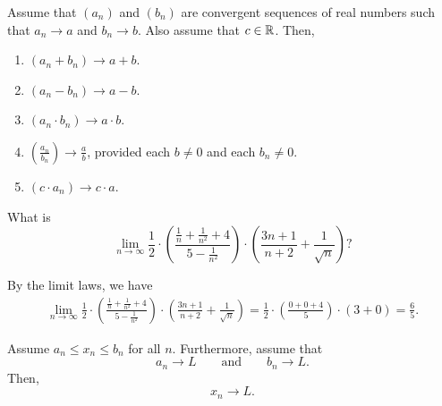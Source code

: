 \documentclass[11pt,twoside=off,numbers=noenddot]{scrbook}
\begin{document}
\begin{theorem}
  Assume that $(a_n)$ and $(b_n)$ are convergent sequences of real
  numbers such that $a_n \to a$ and $b_n \to b$. Also assume that $c
  \in \mathbb R$. Then,
  \begin{enumerate}
    \item $(a_n + b_n) \to a + b$.
    \item $(a_n - b_n) \to a - b$.
    \item $(a_n \cdot b_n) \to a \cdot b$.
    \item $(\frac{a_n}{b_n}) \to \frac{a}{b}$, provided each $b \neq
      0$ and each $b_n \neq 0$.
    \item $(c \cdot a_n) \to c \cdot a$.
  \end{enumerate}
\end{theorem}

\begin{example}
  What is
  \[ \lim_{n\to\infty} \frac{1}{2} \cdot \left(\frac{\frac{1}{n} +
    \frac{1}{n^2} + 4}{5 - \frac{1}{n^2}}\right) \cdot
  \left(\frac{3n+1}{n+2} + \frac{1}{\sqrt{n}}\right)? \]

  By the limit laws, we have
  \begin{align*}
    \lim_{n\to\infty} \frac{1}{2} \cdot \left(\frac{\frac{1}{n} +
    \frac{1}{n^2} + 4}{5 - \frac{1}{n^2}}\right) \cdot
    \left(\frac{3n+1}{n+2} + \frac{1}{\sqrt{n}}\right) = \frac{1}{2}
    \cdot \left(\frac{0 + 0 + 4}{5}\right) \cdot (3 + 0) = \frac{6}{5}.
  \end{align*}
\end{example}

\begin{theorem}
  Assume $a_n \leq x_n \leq b_n$ for all $n$. Furthermore, assume that
  \[ a_n \to L \qquad \text{and} \qquad b_n \to L. \]
  Then,
  \[ x_n \to L. \]
\end{theorem}
\end{document}

